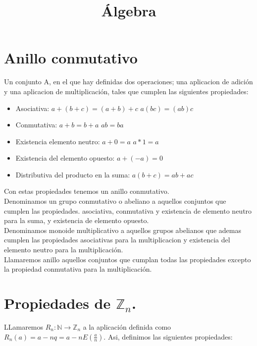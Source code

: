 \documentclass[11pt]{article}
\title{\textbf{Álgebra}}
\date{}
\begin{document}
\maketitle

\section{Anillo conmutativo}

Un conjunto A, en el que hay definidas dos operaciones; una aplicacion de adición y una aplicacion de multiplicación, tales que cumplen las siguientes propiedades:
\begin{itemize}
\item Asociativa: $a+(b+c) = (a+b)+c$\hspace{1cm} $a(bc) = (ab)c$
\item Conmutativa: $a+b = b+a$ \hspace{1cm} $ab = ba$
\item Existencia elemento neutro: $a+0 = a$ \hspace{1cm} $a*1 = a$
\item Existencia del elemento opuesto: $a+(-a) = 0$
\item Distributiva del producto en la suma: $a(b+c) = ab+ ac$

\end{itemize}

Con estas propiedades tenemos un anillo conmutativo.\\

Denominamos un grupo conmutativo o abeliano a aquellos conjuntos que cumplen las propiedades. asociativa, conmutativa y existencia de elemento neutro para la suma, y existencia de elemento opuesto.\\

Denominamos monoide multiplicativo a aquellos grupos abelianos que ademas cumplen las propiedades asociativas para la multiplicacion y existencia del elemento neutro para la multiplicación.\\

Llamaremos anillo aquellos conjuntos que cumplan todas las propiedades excepto la propiedad conmutativa para la multiplicación.\\

\section{Propiedades de $\mathbb{Z}_{n}$.}

LLamaremos $R_n:\mathbb{N} \rightarrow \mathbb{Z}_n$ a la aplicación definida como $R_n(a) = a - nq = a- nE(\frac{a}{n})$. Asi, definimos las siguientes propiedades:
\end{document}
